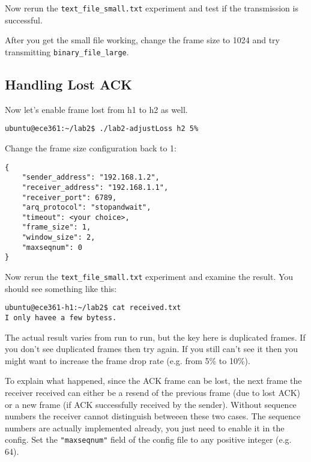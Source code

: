 \documentclass[11pt]{article}
\begin{document}

\noindent Now rerun the \texttt{text\_file\_small.txt} experiment and test if the transmission is successful.

\noindent After you get the small file working, change the frame size to 1024 and try transmitting \texttt{binary\_file\_large}.


\subsection {Handling Lost ACK}
Now let's enable frame lost from h1 to h2 as well.
\begin{lstlisting}[style=ece361-shell-base, caption={}]
ubuntu@ece361:~/lab2$ ./lab2-adjustLoss h2 5%
\end{lstlisting}

Change the frame size configuration back to 1:
\begin{lstlisting}[style=ece361-shell-base, caption={Configuration For Large File}]
{
    "sender_address": "192.168.1.2",
    "receiver_address": "192.168.1.1",
    "receiver_port": 6789,
    "arq_protocol": "stopandwait",
    "timeout": <your choice>,
    "frame_size": 1,
    "window_size": 2,
    "maxseqnum": 0
}
\end{lstlisting}
Now rerun the \texttt{text\_file\_small.txt} experiment and examine the result. You should see something like this:

\begin{lstlisting}[style=ece361-shell-base, caption={}]
ubuntu@ece361-h1:~/lab2$ cat received.txt
I only havee a few bytess.
\end{lstlisting}
The actual result varies from run to run, but the key here is duplicated frames.
If you don't see duplicated frames then try again. If you still can't see it then you might want to increase the frame drop rate (e.g. from 5\% to 10\%).

To explain what happened, since the ACK frame can be lost, the next frame the receiver received can either be a resend of the previous frame (due to lost ACK) or a new frame (if ACK successfully received by the sender).
Without sequence numbers the receiver cannot distinguish betweeen these two cases.
The sequence numbers are actually implemented already, you just need to enable it in the config.
Set the \texttt{"maxseqnum"} field of the config file to any positive integer (e.g. 64).
\end{document}
